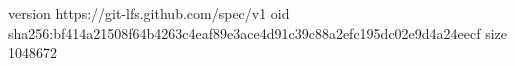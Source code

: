version https://git-lfs.github.com/spec/v1
oid sha256:bf414a21508f64b4263c4eaf89e3ace4d91c39c88a2efc195dc02e9d4a24eecf
size 1048672
